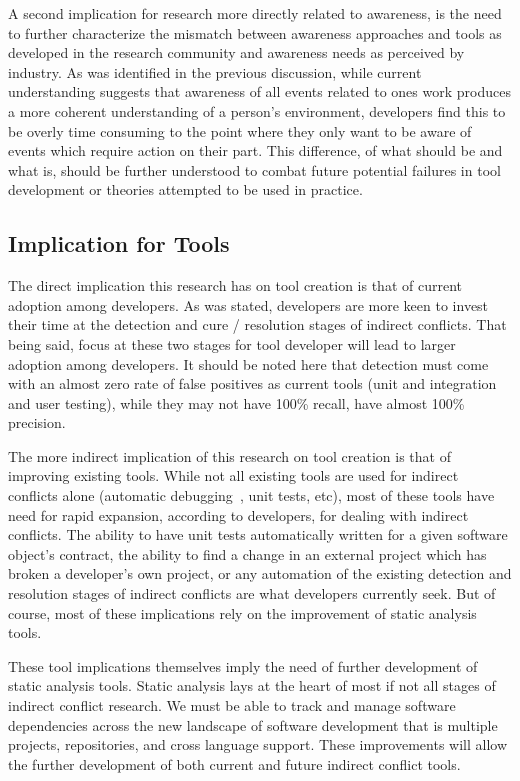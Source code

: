 \documentclass[conference]{IEEEtran}
\begin{document}
A second implication for research more directly related to awareness, is the need to further characterize the
mismatch between awareness approaches and tools as developed in the research community and awareness needs as perceived
by industry.
As was identified in the previous discussion, while current understanding suggests that awareness of all events related to ones work
produces a more coherent understanding of a person's environment, developers find this to be overly time consuming
to the point where they only want to be aware of events which require action on their part. This difference, of what 
should be and what is, should be further understood to combat future potential failures in
tool development or theories attempted to be used in practice.

\subsection{Implication for Tools}
\label{sec:implt}

The direct implication this research has on tool creation is that of current adoption among developers. As was stated,
developers are more keen to invest their time at the detection and cure / resolution stages of indirect conflicts. That being 
said, focus at these two stages for tool developer will lead to larger adoption among developers.
It should be noted here that detection must come with an almost zero rate of false positives as
current tools (unit and integration and user testing), while they may not have 100\% recall, have almost 100\% precision.

The more indirect implication of this research on tool creation is that of improving existing tools. While not all existing
tools are used for indirect conflicts alone (automatic debugging~\cite{Zeller:2005:WPF}, unit tests, etc), most of these tools
have need for rapid expansion, according to developers, for dealing with indirect conflicts. The ability to have unit tests
automatically written for a given software object's contract, the ability to find a change  in an external project
which has broken a developer's own project, or any automation of the existing detection and resolution stages of indirect
conflicts are what developers currently seek. But of course, most of these implications rely on the improvement of 
static analysis tools.

These tool implications themselves imply the need of further development of static analysis tools. Static 
analysis lays at the heart of most if not all stages of indirect conflict research. We must be able to track and manage
software dependencies across the new landscape of software development that is multiple projects, repositories, and cross
language support. These improvements will allow the further development of both current and future indirect conflict
tools.
\end{document}
